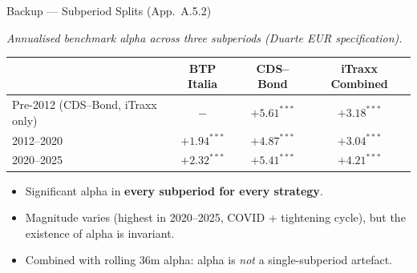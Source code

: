 \documentclass[aspectratio=169,11pt]{beamer}
\newcommand{\hlt}[1]{\textcolor{edhecred}{\textbf{#1}}}     %
\begin{document}
\begin{frame}[t]{Backup --- Subperiod Splits (App.\ A.5.2)}
\centering
\scriptsize
\vspace{0.10cm}

\textit{Annualised benchmark alpha across three subperiods (Duarte EUR specification).}

\vspace{0.30cm}
\renewcommand{\arraystretch}{1.20}
\setlength{\tabcolsep}{8pt}

\begin{tabular}{lccc}
\toprule
                       & BTP Italia       & CDS--Bond        & iTraxx Combined \\
\midrule
Pre-2012 (CDS--Bond, iTraxx only) & $-$           & $+5.61^{***}$ & $+3.18^{***}$ \\
2012--2020             & $+1.94^{***}$    & $+4.87^{***}$    & $+3.04^{***}$ \\
2020--2025             & $+2.32^{***}$    & $+5.41^{***}$    & $+4.21^{***}$ \\
\bottomrule
\end{tabular}

\vspace{0.40cm}

\begin{itemize}\itemsep=0.06cm\footnotesize
  \item Significant alpha in \hlt{every subperiod for every strategy}.
  \item Magnitude varies (highest in 2020--2025, COVID + tightening cycle), but the existence of alpha is invariant.
  \item Combined with rolling 36m alpha: alpha is \emph{not} a single-subperiod artefact.
\end{itemize}

\end{frame}
\end{document}
